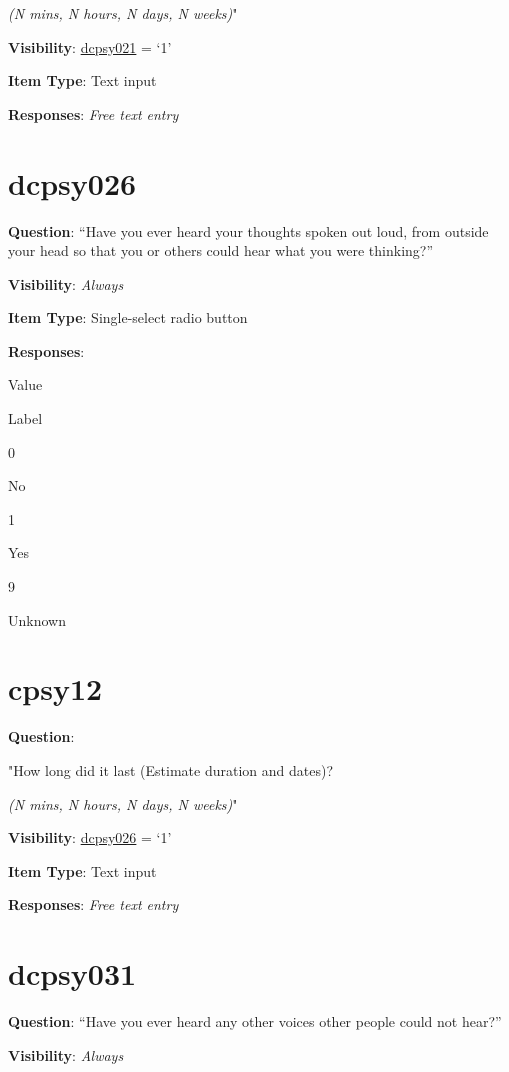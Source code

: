 \documentclass[]{book}
\begin{document}
\emph{(N mins, N hours, N days, N weeks)}"

\textbf{Visibility}: \protect\hyperlink{dcpsy021}{dcpsy021} = `1'

\textbf{Item Type}: Text input

\textbf{Responses}: \emph{Free text entry}

\hypertarget{dcpsy026}{%
\section{dcpsy026}\label{dcpsy026}}

\textbf{Question}: ``Have you ever heard your thoughts spoken out loud, from outside your head so that you or others could hear what you were thinking?''

\textbf{Visibility}: \emph{Always}

\textbf{Item Type}: Single-select radio button

\textbf{Responses}:

Value

Label

0

No

1

Yes

9

Unknown

\hypertarget{cpsy12}{%
\section{cpsy12}\label{cpsy12}}

\textbf{Question}:

"How long did it last (Estimate duration and dates)?

\emph{(N mins, N hours, N days, N weeks)}"

\textbf{Visibility}: \protect\hyperlink{dcpsy026}{dcpsy026} = `1'

\textbf{Item Type}: Text input

\textbf{Responses}: \emph{Free text entry}

\hypertarget{dcpsy031}{%
\section{dcpsy031}\label{dcpsy031}}

\textbf{Question}: ``Have you ever heard any other voices other people could not hear?''

\textbf{Visibility}: \emph{Always}
\end{document}

